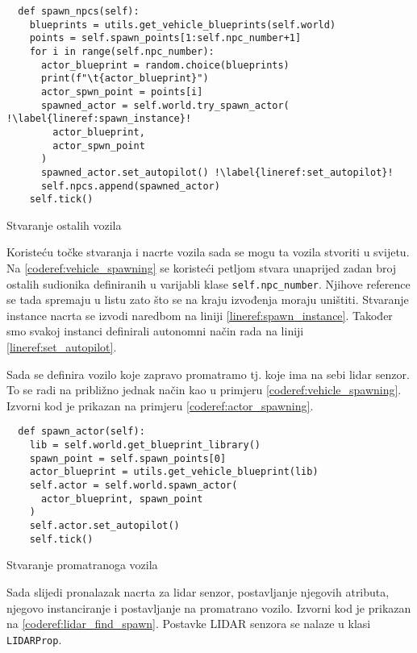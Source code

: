 \begin{listing}[h!]
  \begin{verbatim}
  def spawn_npcs(self):
    blueprints = utils.get_vehicle_blueprints(self.world)
    points = self.spawn_points[1:self.npc_number+1]
    for i in range(self.npc_number):
      actor_blueprint = random.choice(blueprints)
      print(f"\t{actor_blueprint}")
      actor_spwn_point = points[i]
      spawned_actor = self.world.try_spawn_actor( !\label{lineref:spawn_instance}!
        actor_blueprint,
        actor_spwn_point
      )
      spawned_actor.set_autopilot() !\label{lineref:set_autopilot}!
      self.npcs.append(spawned_actor)
    self.tick()
  \end{verbatim}
  \caption{Stvaranje ostalih vozila}
  \label{coderef:vehicle_spawning}
\end{listing}

Koristeću točke stvaranja i nacrte vozila sada se mogu ta vozila stvoriti u svijetu. Na \ref{coderef:vehicle_spawning} se koristeći petljom stvara unaprijed zadan broj ostalih sudionika definiranih u varijabli klase \texttt{self.npc_number}. Njihove reference se tada spremaju u listu zato što se na kraju izvođenja moraju uništiti. Stvaranje instance nacrta se izvodi naredbom na liniji \ref{lineref:spawn_instance}. Također smo svakoj instanci definirali autonomni način rada na liniji \ref{lineref:set_autopilot}.

Sada se definira vozilo koje zapravo promatramo tj. koje ima na sebi lidar senzor. To se radi na približno jednak način kao u primjeru \ref{coderef:vehicle_spawning}. Izvorni kod je prikazan na primjeru \ref{coderef:actor_spawning}.


\begin{listing}[h!]
  \begin{verbatim}
  def spawn_actor(self):
    lib = self.world.get_blueprint_library()
    spawn_point = self.spawn_points[0]
    actor_blueprint = utils.get_vehicle_blueprint(lib)
    self.actor = self.world.spawn_actor(
      actor_blueprint, spawn_point
    )
    self.actor.set_autopilot()
    self.tick()
  \end{verbatim}
  \caption{Stvaranje promatranoga vozila}
  \label{coderef:actor_spawning}
\end{listing}

Sada slijedi pronalazak nacrta za lidar senzor, postavljanje njegovih atributa, njegovo instanciranje i postavljanje na promatrano vozilo. Izvorni kod je prikazan na \ref{coderef:lidar_find_spawn}. Postavke LIDAR senzora se nalaze u klasi \texttt{LIDARProp}.


